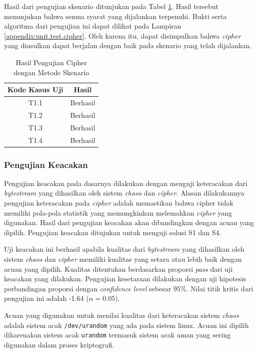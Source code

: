 Hasil dari pengujian skenario ditunjukan pada Tabel \ref{tab:test.result.cipher}. Hasil tersebut menunjukan bahwa semua syarat yang dijalankan terpenuhi. Bukti serta algoritma dari pengujian ini dapat dilihat pada Lampiran \ref{appendix:unit.test.cipher}. Oleh karena itu, dapat disimpulkan bahwa \emph{cipher} yang diusulkan dapat berjalan dengan baik pada skenario yang telah dijalankan.

\begin{table}[!h]
  \centering
  \caption{Hasil Pengujian Cipher dengan Metode Skenario} \label{tab:test.result.cipher}
  \begin{tabular}{|c|c|}
    \hline
    \textbf{Kode Kasus Uji} & \textbf{Hasil} \\ \hline
    T1.1 & Berhasil \\ \hline
    T1.2 & Berhasil \\ \hline
    T1.3 & Berhasil \\ \hline
    T1.4 & Berhasil \\ \hline
  \end{tabular}
\end{table}

\subsubsection{Pengujian Keacakan}

Pengujian keacakan pada dasarnya dilakukan dengan menguji keteracakan dari \emph{bytestream} yang dihasilkan oleh sistem \emph{chaos} dan \emph{cipher}.  Alasan dilakukannya pengujian keteracakan pada \emph{cipher} adalah memastikan bahwa cipher tidak memiliki pola-pola statistik yang memungkinkan melemahkan \emph{cipher} yang digunakan. Hasil dari pengujian keacakan akan dibandingkan dengan acuan yang dipilih. Pengujian keacakan ditujukan untuk menguji solusi S1 dan S4.

Uji keacakan ini berhasil apabila kualitas dari \emph{bytestream} yang dihasilkan oleh sistem \emph{chaos} dan \emph{cipher} memiliki kualitas yang setara atau lebih baik dengan acuan yang dipilih. Kualitas ditentukan berdasarkan proporsi \emph{pass} dari uji keacakan yang dilakukan. Pengujian kesetaraan dilakukan dengan uji hipotesis perbandingan proporsi dengan \emph{confidence level} sebesar 95\%. Nilai titik kritis dari pengujian ini adalah -1.64 ($\alpha = 0.05$).

Acuan yang digunakan untuk menilai kualitas dari keteracakan sistem \emph{chaos} adalah sistem acak \texttt{/dev/urandom} yang ada pada sistem linux. Acuan ini dipilih dikarenakan sistem acak \texttt{urandom} termasuk sistem acak aman yang sering digunakan dalam proses kriptografi. 

